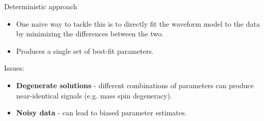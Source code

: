 \documentclass[aspectratio=169, 11pt]{beamer}
\begin{document}


\begin{frame}{Deterministic approach}
\begin{itemize}
    \item One naive way to tackle this is to directly fit the waveform model to the data by minimizing the differences between the two.
    \item Produces a single set of best-fit parameters.
\end{itemize}
\vspace{2em}
Issues:
\begin{itemize}
    \item \textbf{Degenerate solutions} - different combinations of parameters can produce near-identical signals (e.g. mass spin degeneracy).
    \item \textbf{Noisy data} - can lead to biased parameter estimates.
\end{itemize}
\end{frame}
\end{document}
